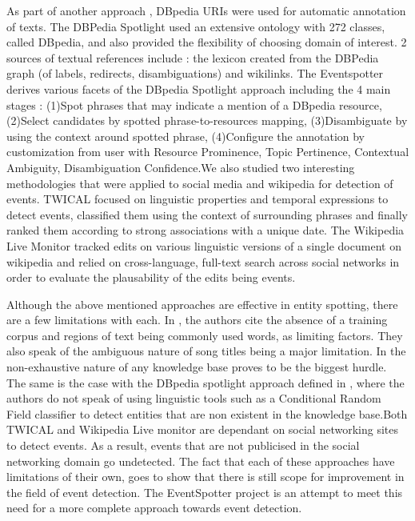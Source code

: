 \documentclass[a4paper,11pt]{report}
\begin{document}
As part of another approach , DBpedia URIs were used for automatic annotation of texts.  The DBPedia Spotlight \cite{Mendes11dbpediaspotlight:} used an extensive ontology with 272 classes, called DBpedia, and also provided the flexibility of choosing domain of interest.  2 sources of textual references include : the lexicon created from the DBPedia graph (of labels, redirects, disambiguations) and wikilinks. The Eventspotter derives various facets of the DBpedia Spotlight approach including the 4 main stages : (1)Spot phrases that may indicate a mention of a DBpedia  resource, (2)Select candidates by spotted phrase-to-resources mapping, (3)Disambiguate by using the context around spotted phrase, (4)Configure the annotation by customization from user with  Resource Prominence, Topic Pertinence, Contextual Ambiguity, Disambiguation Confidence.We also studied two interesting methodologies that were applied to social media and wikipedia for detection of events. TWICAL \cite{Ritter_opendomain} focused on linguistic properties and temporal expressions to detect events, classified them using the context of surrounding phrases and finally ranked them according to strong associations with a unique date. The Wikipedia Live Monitor\cite{DBLP:journals/corr/abs-1303-4702} tracked edits on various linguistic versions of a single document on wikipedia and relied on cross-language, full-text search across social networks in order to evaluate the \cite{Hassell06ontology-drivenautomatic} plausability of the edits being events. \newline

Although the above mentioned approaches are effective in entity spotting, there are a few limitations with each. In \cite{Gruhl_contextand}, the authors cite the absence of a training corpus and regions of text being commonly used words, as limiting factors. They  also speak of the ambiguous nature of song titles being a major limitation. In  \cite{Hassell06ontology-drivenautomatic} the non-exhaustive nature of any knowledge base proves to be the biggest hurdle. The same is the case with the DBpedia spotlight approach defined in \cite{Mendes11dbpediaspotlight:}, where the authors do not speak of using linguistic tools such as a Conditional Random Field classifier to detect entities that are non existent in the knowledge base.Both TWICAL \cite{Ritter_opendomain} and Wikipedia Live monitor \cite{DBLP:journals/corr/abs-1303-4702} are dependant on social networking sites to detect events. As a result, events that are not publicised in the social networking domain go undetected. The fact that each of these approaches have limitations of their own, goes to show that there is still scope for improvement in the field of event detection. The EventSpotter project is an attempt to meet this need for a more complete approach towards event detection. 
\end{document}
